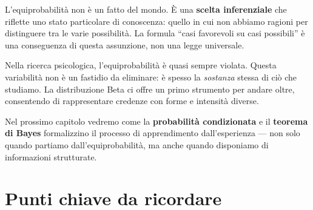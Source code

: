 \documentclass[
  italian,
  letterpaper,
  a4paper,
  11pt,
  open=any]{scrbook}
\theoremstyle{plain}
\theoremstyle{definition}
\theoremstyle{definition}
\theoremstyle{remark}
\begin{document}
L'equiprobabilità non è un fatto del mondo. È una \textbf{scelta
inferenziale} che riflette uno stato particolare di conoscenza: quello
in cui non abbiamo ragioni per distinguere tra le varie possibilità. La
formula ``casi favorevoli su casi possibili'' è una conseguenza di
questa assunzione, non una legge universale.

Nella ricerca psicologica, l'equiprobabilità è quasi sempre violata.
Questa variabilità non è un fastidio da eliminare: è spesso la
\emph{sostanza} stessa di ciò che studiamo. La distribuzione Beta ci
offre un primo strumento per andare oltre, consentendo di rappresentare
credenze con forme e intensità diverse.

Nel prossimo capitolo vedremo come la \textbf{probabilità condizionata}
e il \textbf{teorema di Bayes} formalizzino il processo di apprendimento
dall'esperienza --- non solo quando partiamo dall'equiprobabilità, ma
anche quando disponiamo di informazioni strutturate.

\section*{Punti chiave da ricordare}\label{punti-chiave-da-ricordare-2}

\end{document}
